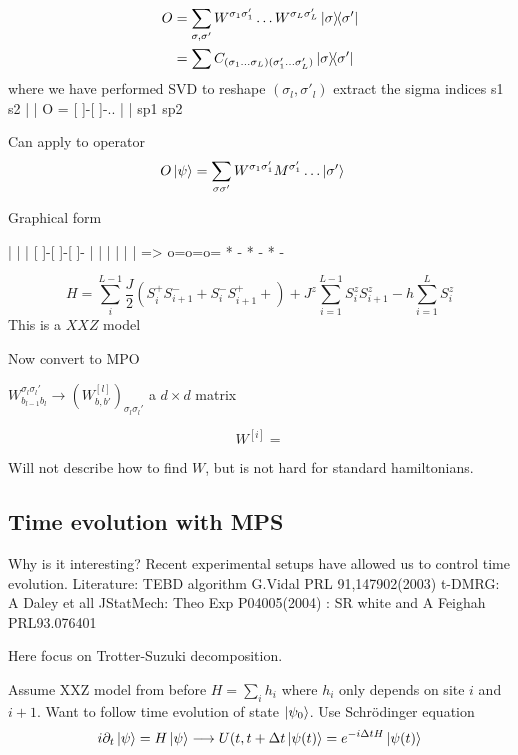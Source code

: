 \documentclass[a4paper]{article}
\begin{document}
\begin{align*}
    O&=\sum_{\sigma,\sigma'} W^{\sigma_1\sigma'_1}\dots W^{\sigma_L \sigma_L'}
    \ket{\sigma}\!\!\bra{\sigma'}\\
     &=\sum C_{(\sigma_1\dots\sigma_L)(\sigma_1'\dots\sigma_L')}
     \ket{\sigma}\!\!\bra{\sigma'}
\end{align*}
where we have performed SVD to reshape $(\sigma_l,\sigma'_l)$ extract the sigma indices 
         s1  s2
         |   |
    O = [ ]-[ ]-..
         |   |
         sp1 sp2

Can apply to operator
         \begin{align*}
             O\ket{\psi}&=\sum_{\sigma\sigma'}
             W^{\sigma_1\sigma'_1}M^{\sigma_1'}\dots\ket{\sigma'}
         \end{align*}


Graphical form

 |   |   | 
[ ]-[ ]-[ ]-          | | |
 |   |   |       =>   o=o=o=
 * - * - * -

 \begin{example}
     \[
         H=\sum_i^{L-1} \frac{J}{2}\left( S_i^+ S_{i+1}^- + S^-_i
         S^+_{i+1}+\right) +J^z\sum_{i=1}^{L-1} S^z_i S^z_{i+1} - h\sum_{i=1}^L
         S^z_i
     \]
     This is a $XXZ$ model

     Now convert to MPO

     $W_{b_{l-1}b_l}^{\sigma_l\sigma_l'}\to
     \left(W^{[l]}_{b,b'}\right)_{\sigma_l\sigma_l'}$ a $d\times d$ matrix

     \[
     W^{[i]}=
 \]
 \end{example}
 Will not describe how to find $W$, but is not hard for standard hamiltonians.
 \subsection{Time evolution with MPS}
Why is it interesting? Recent experimental setups have allowed us to control
time evolution.
Literature: TEBD algorithm G.Vidal PRL 91,147902(2003)
t-DMRG: A Daley et all JStatMech: Theo Exp P04005(2004) 
      : SR white and A Feighah PRL93.076401

Here focus on Trotter-Suzuki decomposition.

Assume XXZ model from before $H=\sum_i h_i$ where $h_i$ only depends on site $i$
and $i+1$.
Want to follow time evolution of state $\ket{\psi_0}$.
Use Schrödinger equation
\[
    i\partial_t\ket{\psi}=H\ket{\psi} \longrightarrow U(t,t+\Delta
    t\ket{\psi(t)}=e^{-i\Delta t H} \ket{\psi(t)}
\]
\end{document}
